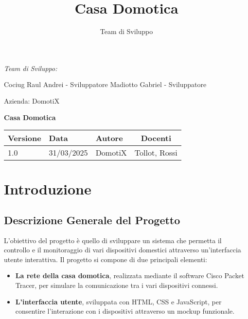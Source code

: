 \documentclass[a4paper,12pt]{article}
\title{Casa Domotica}
\author{Team di Sviluppo}
\date{}
\begin{document}
\begin{titlepage}
    \begin{minipage}[t]{0.4\textwidth}
    \raggedright
    {\large\itshape Team di Sviluppo:\par}
    \vspace{0.2cm}
    
    Cociug Raul Andrei - Sviluppatore 
    Madiotto Gabriel - Sviluppatore
    \end{minipage}
    \hfill
    \begin{minipage}[t]{0.4\textwidth}
    \raggedleft
    {\Large Azienda: DomotiX\par}
    \end{minipage}
    
    \centering
    \vspace*{5cm}
    
    {\Huge\bfseries Casa Domotica\par}
    \vspace{1.5cm}
    
    \vfill
    
    \begin{table}[h]
    \centering
    \begin{tabular}{@{}lllc@{}}
    \toprule
    Versione & Data & Autore & Docenti \\
    \midrule
    1.0 & 31/03/2025 & DomotiX & Tollot, Rossi \\
    \bottomrule
    \end{tabular}
    \end{table}
    
    \thispagestyle{empty}
\end{titlepage}

\tableofcontents
\thispagestyle{fancy}
\newpage

\section{Introduzione}
\subsection{Descrizione Generale del Progetto}
L'obiettivo del progetto è quello di sviluppare un sistema che permetta il controllo e il monitoraggio di vari dispositivi domestici attraverso un'interfaccia utente interattiva.
Il progetto si compone di due principali elementi:\begin{itemize}
    \item \textbf{La rete della casa domotica}, realizzata mediante il software Cisco Packet Tracer, per simulare la comunicazione tra i vari dispositivi connessi.
    \item \textbf{L'interfaccia utente}, sviluppata con HTML, CSS e JavaScript, per consentire l'interazione con i dispositivi attraverso un mockup funzionale.\end{itemize}
\end{document}
